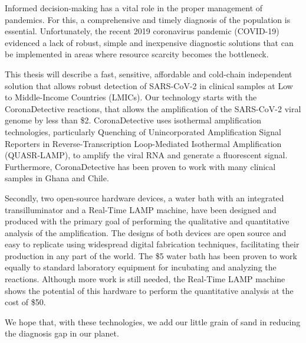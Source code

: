 \begin{abstract*}
Informed decision-making has a vital role in the proper management of pandemics. For this, a comprehensive and timely diagnosis of the population is essential. Unfortunately, the recent 2019 coronavirus pandemic (COVID-19) evidenced a lack of robust, simple and inexpensive diagnostic solutions that can be implemented in areas where resource scarcity becomes the bottleneck.
  
 This thesis will describe a fast, sensitive, affordable and cold-chain independent solution that allows robust detection of SARS-CoV-2 in clinical samples at Low to Middle-Income Countries (LMICs). Our technology starts with the CoronaDetective reactions, that allows the amplification of the SARS-CoV-2 viral genome by less than \$2. CoronaDetective uses isothermal amplification technologies, particularly Quenching of Unincorporated Amplification Signal Reporters in Reverse-Transcription Loop-Mediated Isothermal Amplification (QUASR-LAMP),  to amplify the viral RNA and generate a fluorescent signal. Furthermore, CoronaDetective has been proven to work with many clinical samples in Ghana and Chile.
  
Secondly, two open-source hardware devices, a water bath with an integrated transilluminator and a Real-Time LAMP machine, have been designed and produced with the primary goal of performing the qualitative and quantitative analysis of the amplification. The designs of both devices are open source and easy to replicate using widespread digital fabrication techniques, facilitating their production in any part of the world. The \$5 water bath has been proven to work equally to standard laboratory equipment for incubating and analyzing the reactions. Although more work is still needed, the Real-Time LAMP machine shows the potential of this hardware to perform the quantitative analysis at the cost of \$50. 
  
 We hope that, with these technologies, we add our little grain of sand in reducing the diagnosis gap in our planet.


\end{abstract*}
